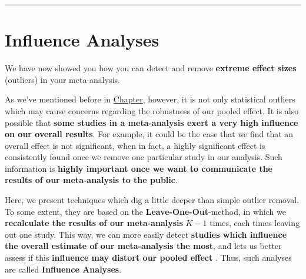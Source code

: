 \documentclass[]{book}
\newenvironment{Shaded}{\begin{snugshade}}{\end{snugshade}}
\newcommand{\KeywordTok}[1]{\textcolor[rgb]{0.13,0.29,0.53}{\textbf{#1}}}
\newcommand{\StringTok}[1]{\textcolor[rgb]{0.31,0.60,0.02}{#1}}
\newcommand{\ControlFlowTok}[1]{\textcolor[rgb]{0.13,0.29,0.53}{\textbf{#1}}}
\newcommand{\OperatorTok}[1]{\textcolor[rgb]{0.81,0.36,0.00}{\textbf{#1}}}
\newcommand{\NormalTok}[1]{#1}
\theoremstyle{definition}
\theoremstyle{definition}
\theoremstyle{definition}
\theoremstyle{remark}
\begin{document}
\begin{Shaded}
\end{Shaded}

\begin{center}\rule{0.5\linewidth}{\linethickness}\end{center}

\hypertarget{influenceanalyses}{\section{Influence
Analyses}\label{influenceanalyses}}

We have now showed you how you can detect and remove \textbf{extreme
effect sizes} (outliers) in your meta-analysis.

As we've mentioned before in \href{}{Chapter}, however, it is not only
statistical outliers which may cause concerns regarding the robustness
of our pooled effect. It is also possible that \textbf{some studies in a
meta-analysis exert a very high influence on our overall results}. For
example, it could be the case that we find that an overall effect is not
significant, when in fact, a highly significant effect is consistently
found once we remove one particular study in our analysis. Such
information is \textbf{highly important once we want to communicate the
results of our meta-analysis to the public}.

Here, we present techniques which dig a little deeper than simple
outlier removal. To some extent, they are based on the
\textbf{Leave-One-Out}-method, in which we \textbf{recalculate the
results of our meta-analysis} \(K-1\) times, each times leaving out one
study. This way, we can more easily detect \textbf{studies which
influence the overall estimate of our meta-analysis the most}, and lets
us better assess if this \textbf{influence may distort our pooled
effect} \citep{viechtbauer2010outlier}. Thus, such analyses are called
\textbf{Influence Analyses}.
\end{document}
